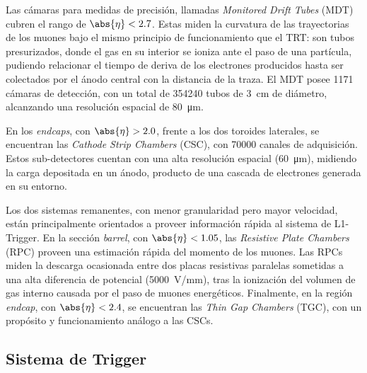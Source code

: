 Las cámaras para medidas de precisión, llamadas \textit{Monitored Drift Tubes} (MDT) cubren el rango de $\abs{\eta} < 2.7$. Estas miden la curvatura de las trayectorias de los muones bajo el mismo principio de funcionamiento que el TRT: son tubos presurizados, donde el gas en su interior se ioniza ante el paso de una partícula, pudiendo relacionar el tiempo de deriva de los electrones producidos hasta ser colectados por el ánodo central con la distancia de la traza. El MDT posee 1171 cámaras de detección, con un total de 354240 tubos de \SI{3}{\centi\meter} de diámetro, alcanzando una resolución espacial de \SI{80}{\micro\meter}.

En los \textit{endcaps}, con $\abs{\eta} > 2.0$, frente a los dos toroides laterales, se encuentran las \textit{Cathode Strip Chambers} (CSC), con 70000 canales de adquisición. Estos sub-detectores cuentan con una alta resolución espacial (\SI{60}{\micro\meter}), midiendo la carga depositada en un ánodo, producto de una cascada de electrones generada en su entorno.

Los dos sistemas remanentes, con menor granularidad pero mayor velocidad, están principalmente orientados a proveer información rápida al sistema de L1-Trigger. En la sección \textit{barrel}, con $\abs{\eta} < 1.05$, las \textit{Resistive Plate Chambers} (RPC) proveen una estimación rápida del momento de los muones. Las RPCs miden la descarga ocasionada entre dos placas resistivas paralelas sometidas a una alta diferencia de potencial (\SI{5000}{\volt/\milli\meter}), tras la ionización del volumen de gas interno causada por el paso de muones energéticos. Finalmente, en la región \textit{endcap}, con $\abs{\eta} < 2.4$, se encuentran las \textit{Thin Gap Chambers} (TGC), con un propósito y funcionamiento análogo a las CSCs.



\subsection{Sistema de Trigger} \label{sec:ch2:atlas:trigger}


